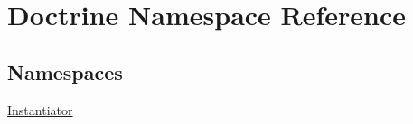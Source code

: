\hypertarget{namespace_doctrine}{}\section{Doctrine Namespace Reference}
\label{namespace_doctrine}
\subsection*{Namespaces}
\begin{DoxyCompactItemize}
\item 
 \mbox{\hyperlink{namespace_doctrine_1_1_instantiator}{Instantiator}}
\end{DoxyCompactItemize}
